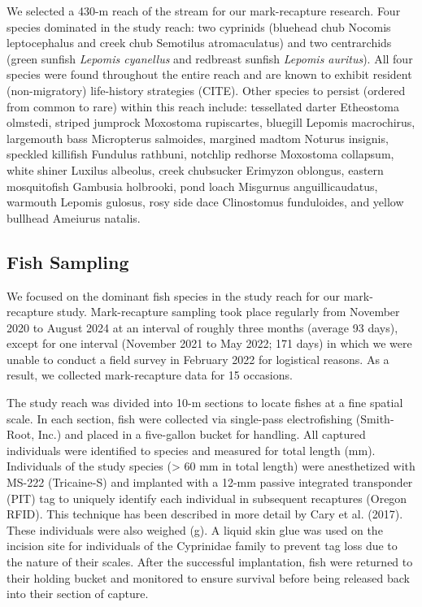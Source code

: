 \documentclass[11pt, class=article, crop=false]{standalone}
\begin{document}
We selected a 430-m reach of the stream for our mark-recapture research. Four species dominated in the study reach: two cyprinids (bluehead chub Nocomis leptocephalus and creek chub Semotilus atromaculatus) and two centrarchids (green sunfish \textit{Lepomis cyanellus} and redbreast sunfish \textit{Lepomis auritus}). All four species were found throughout the entire reach and are known to exhibit resident (non-migratory) life-history strategies (CITE). Other species to persist (ordered from common to rare) within this reach include: tessellated darter Etheostoma olmstedi, striped jumprock Moxostoma rupiscartes, bluegill Lepomis macrochirus, largemouth bass Micropterus salmoides, margined madtom Noturus insignis, speckled killifish Fundulus rathbuni, notchlip redhorse Moxostoma collapsum, white shiner Luxilus albeolus, creek chubsucker Erimyzon oblongus, eastern mosquitofish Gambusia holbrooki, pond loach Misgurnus anguillicaudatus, warmouth Lepomis gulosus, rosy side dace Clinostomus funduloides, and yellow bullhead Ameiurus natalis. 

\subsection{Fish Sampling}

We focused on the dominant fish species in the study reach for our mark-recapture study. Mark-recapture sampling took place regularly from November 2020 to August 2024 at an interval of roughly three months (average 93 days), except for one interval (November 2021 to May 2022; 171 days) in which we were unable to conduct a field survey in February 2022 for logistical reasons. As a result, we collected mark-recapture data for 15 occasions.

The study reach was divided into 10-m sections to locate fishes at a fine spatial scale. In each section, fish were collected via single-pass electrofishing (Smith-Root, Inc.) and placed in a five-gallon bucket for handling. All captured individuals were identified to species and measured for total length (mm). Individuals of the study species (> 60 mm in total length) were anesthetized with MS-222 (Tricaine-S) and implanted with a 12-mm passive integrated transponder (PIT) tag to uniquely identify each individual in subsequent recaptures (Oregon RFID). This technique has been described in more detail by Cary et al. (2017). These individuals were also weighed (g). A liquid skin glue was used on the incision site for individuals of the Cyprinidae family to prevent tag loss due to the nature of their scales. After the successful implantation, fish were returned to their holding bucket and monitored to ensure survival before being released back into their section of capture. 
\end{document}

